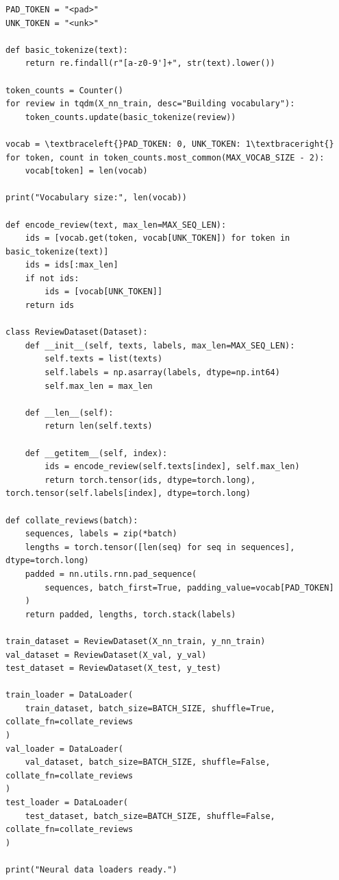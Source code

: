 \documentclass[12pt,a4paper,oneside]{report}
\begin{document}
\begin{Verbatim}[commandchars=\\\{\},breaklines=true,breakanywhere=true,fontsize=\scriptsize,frame=leftline,framesep=2mm,rulecolor=\color{gray}]
PAD_TOKEN = "<pad>"
UNK_TOKEN = "<unk>"

def basic_tokenize(text):
    return re.findall(r"[a-z0-9']+", str(text).lower())

token_counts = Counter()
for review in tqdm(X_nn_train, desc="Building vocabulary"):
    token_counts.update(basic_tokenize(review))

vocab = \textbraceleft{}PAD_TOKEN: 0, UNK_TOKEN: 1\textbraceright{}
for token, count in token_counts.most_common(MAX_VOCAB_SIZE - 2):
    vocab[token] = len(vocab)

print("Vocabulary size:", len(vocab))

def encode_review(text, max_len=MAX_SEQ_LEN):
    ids = [vocab.get(token, vocab[UNK_TOKEN]) for token in basic_tokenize(text)]
    ids = ids[:max_len]
    if not ids:
        ids = [vocab[UNK_TOKEN]]
    return ids

class ReviewDataset(Dataset):
    def __init__(self, texts, labels, max_len=MAX_SEQ_LEN):
        self.texts = list(texts)
        self.labels = np.asarray(labels, dtype=np.int64)
        self.max_len = max_len

    def __len__(self):
        return len(self.texts)

    def __getitem__(self, index):
        ids = encode_review(self.texts[index], self.max_len)
        return torch.tensor(ids, dtype=torch.long), torch.tensor(self.labels[index], dtype=torch.long)

def collate_reviews(batch):
    sequences, labels = zip(*batch)
    lengths = torch.tensor([len(seq) for seq in sequences], dtype=torch.long)
    padded = nn.utils.rnn.pad_sequence(
        sequences, batch_first=True, padding_value=vocab[PAD_TOKEN]
    )
    return padded, lengths, torch.stack(labels)

train_dataset = ReviewDataset(X_nn_train, y_nn_train)
val_dataset = ReviewDataset(X_val, y_val)
test_dataset = ReviewDataset(X_test, y_test)

train_loader = DataLoader(
    train_dataset, batch_size=BATCH_SIZE, shuffle=True, collate_fn=collate_reviews
)
val_loader = DataLoader(
    val_dataset, batch_size=BATCH_SIZE, shuffle=False, collate_fn=collate_reviews
)
test_loader = DataLoader(
    test_dataset, batch_size=BATCH_SIZE, shuffle=False, collate_fn=collate_reviews
)

print("Neural data loaders ready.")
\end{Verbatim}
\end{document}
